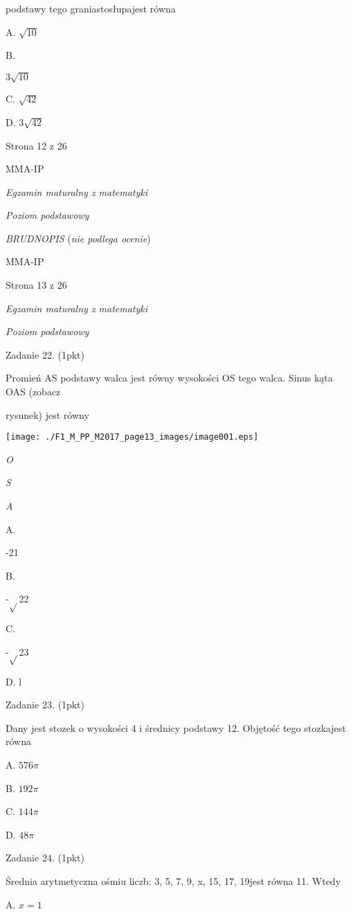 \documentclass[a4paper,12pt]{article}
\begin{document}
podstawy tego graniastosłupajest równa

A. $\sqrt{10}$

B.

$3\sqrt{10}$

C. $\sqrt{42}$

D. $3\sqrt{42}$

Strona 12 z 26

MMA-IP





{\it Egzamin maturalny z matematyki}

{\it Poziom podstawowy}

{\it BRUDNOPIS} ({\it nie podlega ocenie})

MMA-IP

Strona 13 z 26





{\it Egzamin maturalny z matematyki}

{\it Poziom podstawowy}

Zadanie 22. (1pkt)

Promień AS podstawy walca jest równy wysokości OS tego walca. Sinus kąta OAS (zobacz

rysunek) jest równy
\begin{center}
\texttt{[image: ./F1\_M\_PP\_M2017\_page13\_images/image001.eps]}
\end{center}
{\it O}

{\it S}

{\it A}

A.

-21

B.

-$\sqrt{}$22

C.

-$\sqrt{}$23

D. l

Zadanie 23. (1pkt)

Dany jest stozek o wysokości 4 i średnicy podstawy 12. Objętość tego stozkajest równa

A. $ 576\pi$

B. $ 192\pi$

C. $ 144\pi$

D. $ 48\pi$

Zadanie 24. (1pkt)

Średnia arytmetyczna ośmiu liczb: 3, 5, 7, 9, x, 15, 17, 19jest równa 11. Wtedy

A. $x=1$
\end{document}
